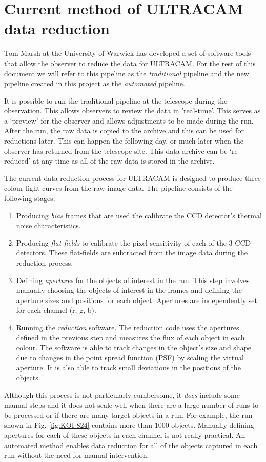 \section{Current method of ULTRACAM data reduction}

Tom Marsh at the University of Warwick has developed a set of software tools that allow the observer to reduce the data for ULTRACAM. For the rest of this document we will refer to this pipeline as the \emph{traditional} pipeline and the new pipeline created in this project as the \emph{automated} pipeline. 

It is possible to run the traditional pipeline at the telescope during the observation. This allows observers to review the data in 'real-time'. This serves as a `preview' for the observer and allows adjustments to be made during the run. After the run, the raw data is copied to the archive and this can be used for reductions later. This can happen the following day, or much later when the observer has returned from the telescope site. This data archive can be `re-reduced' at any time as all of the raw data is stored in the archive. 

The current data reduction process for ULTRACAM is designed to produce three colour light curves from the raw image data. The pipeline consists of the following stages:
\begin{enumerate}
	\item Producing \emph{bias} frames that are used the calibrate the CCD detector's thermal noise characteristics. 
	\item Producing \emph{flat-fields} to calibrate the pixel sensitivity of each of the 3 CCD detectors. These flat-fields are subtracted from the image data during the reduction process.
	\item Defining \emph{apertures} for the objects of interest in the run. This step involves manually choosing the objects of interest in the frames and defining the aperture sizes and positions for each object. Apertures are independently set for each channel (r, g, b). 
	\item Running the \emph{reduction} software. The reduction code uses the apertures defined in the previous step and measures the flux of each object in each colour. The software is able to track changes in the object's size and shape due to changes in the point spread function (PSF) by scaling the virtual aperture. It is also able to track small deviations in the positions of the objects. 
\end{enumerate} 
Although this process is not particularly cumbersome, it \emph{does} include some manual steps and it does not scale well when there are a large number of runs to be processed or if there are many target objects in a run. For example, the run shown in Fig. \ref{fig:KOI-824} contains more than 1000 objects. Manually defining apertures for each of these objects in each channel is not really practical. An automated method enables data reduction for all of the objects captured in each run without the need for manual intervention. 

